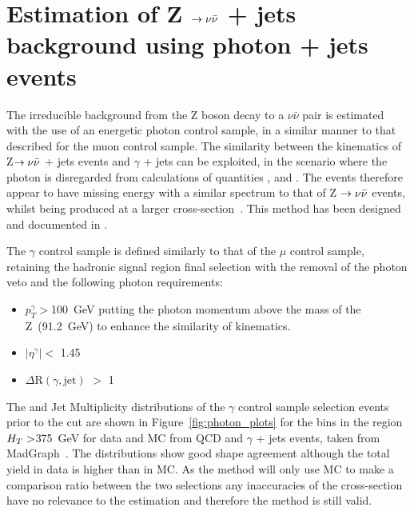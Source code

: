 \section{Estimation of Z $\rightarrow \nu \bar{\nu}$ + jets background using photon + jets events}

The irreducible background from the Z boson decay to a $\nu \bar{\nu}$ pair is estimated with the use of an energetic photon control sample, in a similar manner to that described for the muon control sample. The similarity between the kinematics of Z$ \rightarrow \nu \bar{\nu}$ + jets events and $\gamma$ + jets can be exploited, in the scenario where the photon is disregarded from calculations of quantities \HT, \MHT and \alt. The events therefore appear to have missing energy with a similar spectrum to that of Z $\rightarrow \nu \bar{\nu}$ events, whilst being produced at a larger cross-section~\cite{gamjetNLO}. This method has been designed and documented in \cite{SUS-10-001}.

The $\gamma$ control sample is defined similarly to that of the $\mu$ control sample, retaining the hadronic signal region final selection with the removal of the photon veto and the following photon requirements:

\begin{itemize}
\item $p^{\gamma}_{T} > $100~GeV putting the photon momentum above the mass of the Z~(91.2~GeV) to enhance the similarity of kinematics.
\item $| \eta^{\gamma}| <$ 1.45
\item $\Delta \textrm{R}(\gamma, \textrm{jet})$ $>$ 1
\end{itemize}

The \alt and Jet Multiplicity distributions of the $\gamma$ control sample selection events prior to the \alt cut are shown in Figure~\ref{fig:photon_plots} for the bins in the region $H_{T} > $375~GeV for data and MC from QCD and $\gamma$ + jets events, taken from MadGraph~\cite{madgraph}. The distributions show good shape agreement although the total yield in data is higher than in MC. As the method will only use MC to make a comparison ratio between the two selections any inaccuracies of the cross-section have no relevance to the estimation and therefore the method is still valid.



